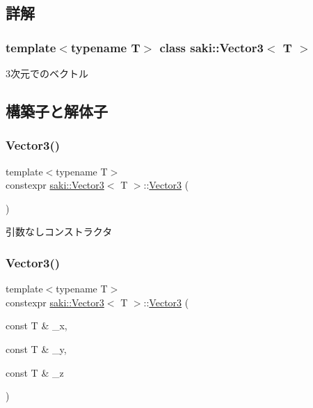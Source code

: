 \subsection{詳解}
\subsubsection*{template$<$typename T$>$\newline
class saki\+::\+Vector3$<$ T $>$}

3次元でのベクトル 

\subsection{構築子と解体子}
\mbox{\label{classsaki_1_1_vector3_a8617fe1a8d279c9673628728a0c5e5c6}} 
\subsubsection{\texorpdfstring{Vector3()}{Vector3()}\hspace{0.1cm}{\footnotesize\ttfamily [1/4]}}
{\footnotesize\ttfamily template$<$typename T$>$ \\
constexpr \mbox{\hyperlink{classsaki_1_1_vector3}{saki\+::\+Vector3}}$<$ T $>$\+::\mbox{\hyperlink{classsaki_1_1_vector3}{Vector3}} (\begin{DoxyParamCaption}{ }\end{DoxyParamCaption})\hspace{0.3cm}{\ttfamily [inline]}}



引数なしコンストラクタ 

\mbox{\label{classsaki_1_1_vector3_abaf9038ebdc4895d7df1319b6234d790}} 
\subsubsection{\texorpdfstring{Vector3()}{Vector3()}\hspace{0.1cm}{\footnotesize\ttfamily [2/4]}}
{\footnotesize\ttfamily template$<$typename T$>$ \\
constexpr \mbox{\hyperlink{classsaki_1_1_vector3}{saki\+::\+Vector3}}$<$ T $>$\+::\mbox{\hyperlink{classsaki_1_1_vector3}{Vector3}} (\begin{DoxyParamCaption}\item[{const T \&}]{\+\_\+x,  }\item[{const T \&}]{\+\_\+y,  }\item[{const T \&}]{\+\_\+z }\end{DoxyParamCaption})\hspace{0.3cm}{\ttfamily [inline]}}



